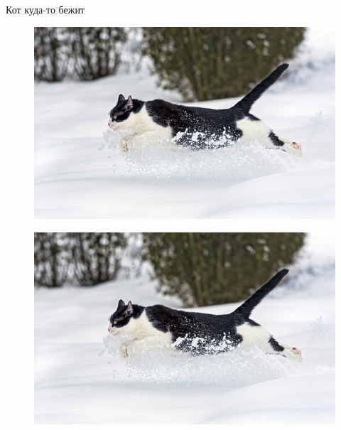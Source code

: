 \documentclass{article}
\begin{document}
Кот куда-то бежит \\
\begin{figure}[t]
\includegraphics[scale=0.25]{cat.jpg} \\
\end{figure}
\begin{figure}[b]
\includegraphics[scale=0.25]{cat.jpg} \\
\end{figure}
\end{document}
